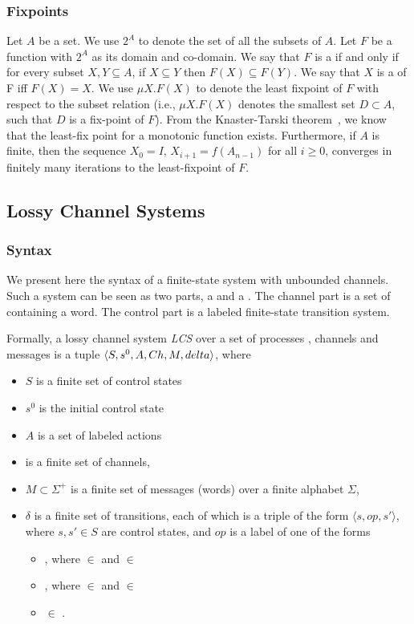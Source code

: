 \subsubsection{Fixpoints}
Let $A$ be a set. We use $2^A$ to denote the set of all the subsets of $A$. Let $F$ be a function with $2^A$ as its domain and co-domain. We say that $F$ is a  if and only if for every subset $X,Y \subseteq A$, if $X \subseteq Y$ then $F(X) \subseteq F(Y)$.  We say that $X$ is a  of F iff $F(X)=X$. We use $\mu X. F(X)$ to denote the least fixpoint of $F$ with respect to the subset relation (i.e.,  $\mu X. F(X)$ denotes the smallest set $D \subset A$, such that $D$ is a fix-point of $F$). From the Knaster-Tarski theorem~\cite{tarski}, we know that the least-fix point for a monotonic function exists. Furthermore, if $A$ is finite, then the sequence $X_0 = I$, $X_{i+1} = f(A_{n-1})$ for all $i \geq 0$, converges in finitely many iterations to the least-fixpoint of $F$.

\subsection{Lossy Channel Systems}
\subsubsection{Syntax}
We present here the syntax of a finite-state system with unbounded channels. Such a system can be seen as two parts, a  and a . The channel part is a set of  containing a word. The control part is a labeled finite-state transition system.

\label{CS}
Formally, a lossy channel system \emph{LCS} over a set of processes , channels  and messages  is a tuple $\langle S,s^0, A, Ch,M, delta\rangle$, where
\begin{itemize}
  \item $S$ is a finite set of control states
  \item $s^0$ is the initial control state
  \item $A$ is a set of labeled actions
  \item {} is a finite set of channels,
  \item $M \subset \Sigma^+$ is a finite set of messages (words) over a finite alphabet $\Sigma$,
  \item $\delta$ is a finite set of transitions, each of which is a triple of the form $\langle s,op,s'\rangle$, where $s, s'\in S$ are control states, and $op$ is a label of one of the forms
    \begin{itemize}
      \item {}, where  $\in$  and  $\in$ 
      \item {}, where  $\in$  and  $\in$ 
      \item {} $\in$ .
    \end{itemize}
\end{itemize}

